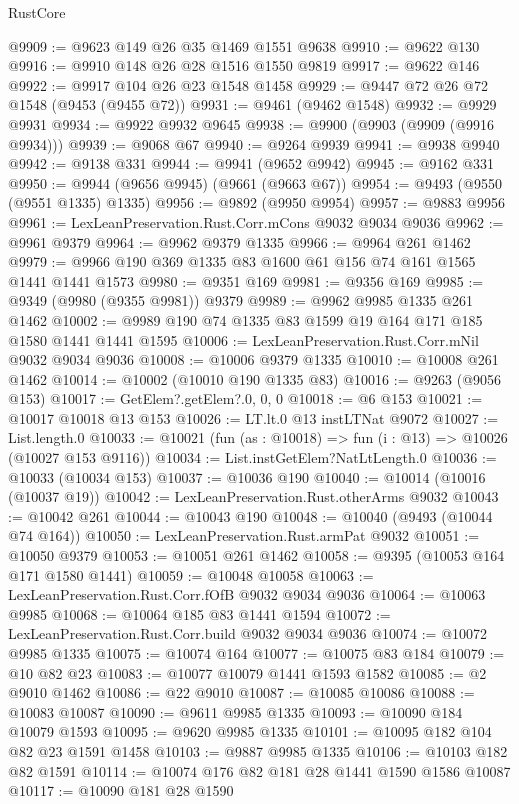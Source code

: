 \begin{lexlean}{RustCore}
\begin{coremodule}
@9909 := @9623 @149 @26 @35 @1469 @1551 @9638
@9910 := @9622 @130
@9916 := @9910 @148 @26 @28 @1516 @1550 @9819
@9917 := @9622 @146
@9922 := @9917 @104 @26 @23 @1548 @1458
@9929 := @9447 @72 @26 @72 @1548 (@9453 (@9455 @72))
@9931 := @9461 (@9462 @1548)
@9932 := @9929 @9931
@9934 := @9922 @9932 @9645
@9938 := @9900 (@9903 (@9909 (@9916 @9934)))
@9939 := @9068 @67
@9940 := @9264 @9939
@9941 := @9938 @9940
@9942 := @9138 @331
@9944 := @9941 (@9652 @9942)
@9945 := @9162 @331
@9950 := @9944 (@9656 @9945) (@9661 (@9663 @67))
@9954 := @9493 (@9550 (@9551 @1335) @1335)
@9956 := @9892 (@9950 @9954)
@9957 := @9883 @9956
@9961 := LexLeanPreservation.Rust.Corr.mCons @9032 @9034 @9036
@9962 := @9961 @9379
@9964 := @9962 @9379 @1335
@9966 := @9964 @261 @1462
@9979 := @9966 @190 @369 @1335 @83 @1600 @61 @156 @74 @161 @1565 @1441 @1441 @1573
@9980 := @9351 @169
@9981 := @9356 @169
@9985 := @9349 (@9980 (@9355 @9981)) @9379
@9989 := @9962 @9985 @1335 @261 @1462
@10002 := @9989 @190 @74 @1335 @83 @1599 @19 @164 @171 @185 @1580 @1441 @1441 @1595
@10006 := LexLeanPreservation.Rust.Corr.mNil @9032 @9034 @9036
@10008 := @10006 @9379 @1335
@10010 := @10008 @261 @1462
@10014 := @10002 (@10010 @190 @1335 @83)
@10016 := @9263 (@9056 @153)
@10017 := GetElem?.getElem?.{0, 0, 0}
@10018 := @6 @153
@10021 := @10017 @10018 @13 @153
@10026 := LT.lt.{0} @13 instLTNat @9072
@10027 := List.length.{0}
@10033 := @10021 (fun (as : @10018) => fun (i : @13) => @10026 (@10027 @153 @9116))
@10034 := List.instGetElem?NatLtLength.{0}
@10036 := @10033 (@10034 @153)
@10037 := @10036 @190
@10040 := @10014 (@10016 (@10037 @19))
@10042 := LexLeanPreservation.Rust.otherArms @9032
@10043 := @10042 @261
@10044 := @10043 @190
@10048 := @10040 (@9493 (@10044 @74 @164))
@10050 := LexLeanPreservation.Rust.armPat @9032
@10051 := @10050 @9379
@10053 := @10051 @261 @1462
@10058 := @9395 (@10053 @164 @171 @1580 @1441)
@10059 := @10048 @10058
@10063 := LexLeanPreservation.Rust.Corr.fOfB @9032 @9034 @9036
@10064 := @10063 @9985
@10068 := @10064 @185 @83 @1441 @1594
@10072 := LexLeanPreservation.Rust.Corr.build @9032 @9034 @9036
@10074 := @10072 @9985 @1335
@10075 := @10074 @164
@10077 := @10075 @83 @184
@10079 := @10 @82 @23
@10083 := @10077 @10079 @1441 @1593 @1582
@10085 := @2 @9010 @1462
@10086 := @22 @9010
@10087 := @10085 @10086
@10088 := @10083 @10087
@10090 := @9611 @9985 @1335
@10093 := @10090 @184 @10079 @1593
@10095 := @9620 @9985 @1335
@10101 := @10095 @182 @104 @82 @23 @1591 @1458
@10103 := @9887 @9985 @1335
@10106 := @10103 @182 @82 @1591
@10114 := @10074 @176 @82 @181 @28 @1441 @1590 @1586 @10087
@10117 := @10090 @181 @28 @1590

\end{coremodule}
\end{lexlean}
